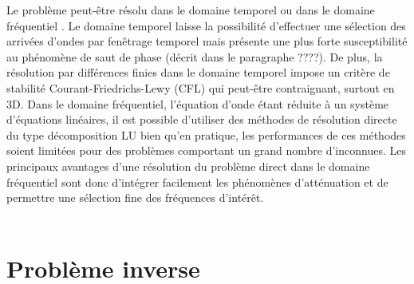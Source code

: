 
Le problème peut-être résolu dans le domaine temporel ou dans le domaine fréquentiel \citep{vigh_2008}. Le domaine temporel laisse la possibilité d'effectuer une sélection des arrivées d'ondes par fenêtrage temporel mais présente une plus forte susceptibilité au phénomène de saut de phase (décrit dans le paragraphe ????).  De plus, la résolution par différences finies dans le domaine temporel impose un critère de stabilité Courant-Friedrichs-Lewy (CFL) qui peut-être contraignant, surtout en 3D. Dans le domaine fréquentiel, l'équation d'onde étant réduite à un système d'équations linéaires, il est possible d'utiliser des méthodes de résolution directe du type décomposition LU bien qu'en pratique, les performances de ces méthodes soient limitées pour des problèmes comportant un grand nombre d'inconnues.  Les principaux avantages d'une résolution du problème direct dans le domaine fréquentiel sont donc d'intégrer facilement les phénomènes d'atténuation et de permettre une sélection fine des fréquences d'intérêt. \\~\\







\section{Problème inverse}

